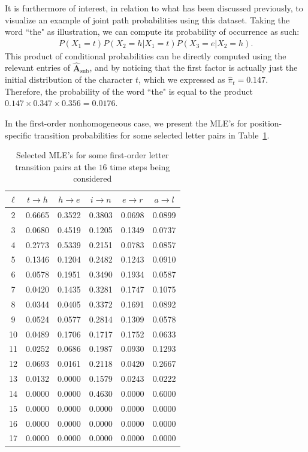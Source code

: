 \documentclass[11pt, a4paper]{article}
\numberwithin{equation}{section}
\theoremstyle{plain}
\theoremstyle{definition}
\begin{document}
It is furthermore of interest, in relation to what has been discussed previously, to visualize an example of joint path probabilities using this dataset. Taking the word ``the" as illustration, we can compute its probability of occurrence as such: 
\begin{align}
    P(X_1=t)P(X_2=h |X_1=t)P(X_3=e|X_2=h).
\end{align}
\label{eqn: applic_path_prob}
This product of conditional probabilities can be directly computed using the relevant entries of $\hat{\mathbf{A}}_{\text{sub}}$, and by noticing that the first factor is actually just the initial distribution of the character $t$, which we expressed as $\hat{\pi}_t=0.147$. Therefore, the probability of the word ``the" is equal to the product $0.147 \times 0.347 \times 0.356 = 0.0176.$ 

In the first-order nonhomogeneous case, we present the MLE's for position-specific transition probabilities for some selected letter pairs in Table~\ref{tab:mle_nonhom}.

\begin{table}[h]
\centering
\caption{Selected MLE's for some first-order letter transition pairs at the $16$ time steps being considered}
\label{tab:mle_nonhom}
\begin{tabular}{c ccccc}
\toprule
$\ell$ & $t\!\to\! h$ & $h\!\to\! e$ & $i\!\to\! n$ & $e\!\to\! r$ & $a\!\to\! l$ \\
\midrule
2  & 0.6665 & 0.3522 & 0.3803 & 0.0698 & 0.0899 \\
3  & 0.0680 & 0.4519 & 0.1205 & 0.1349 & 0.0737 \\
4  & 0.2773 & 0.5339 & 0.2151 & 0.0783 & 0.0857 \\
5  & 0.1346 & 0.1204 & 0.2482 & 0.1243 & 0.0910 \\
6  & 0.0578 & 0.1951 & 0.3490 & 0.1934 & 0.0587 \\
7  & 0.0420 & 0.1435 & 0.3281 & 0.1747 & 0.1075 \\
8  & 0.0344 & 0.0405 & 0.3372 & 0.1691 & 0.0892 \\
9  & 0.0524 & 0.0577 & 0.2814 & 0.1309 & 0.0578 \\
10  & 0.0489 & 0.1706 & 0.1717 & 0.1752 & 0.0633 \\
11 & 0.0252 & 0.0686 & 0.1987 & 0.0930 & 0.1293 \\
12 & 0.0693 & 0.0161 & 0.2118 & 0.0420 & 0.2667 \\
13 & 0.0132 & 0.0000 & 0.1579 & 0.0243 & 0.0222 \\
14 & 0.0000 & 0.0000 & 0.4630 & 0.0000 & 0.6000 \\
15 & 0.0000 & 0.0000 & 0.0000 & 0.0000 & 0.0000 \\
16 & 0.0000 & 0.0000 & 0.0000 & 0.0000 & 0.0000 \\
17 & 0.0000 & 0.0000 & 0.0000 & 0.0000 & 0.0000 \\
\bottomrule
\end{tabular}
\end{table}
\end{document}
